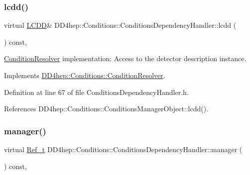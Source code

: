 \subsubsection{\texorpdfstring{lcdd()}{lcdd()}}
{\footnotesize\ttfamily virtual \hyperlink{class_d_d4hep_1_1_geometry_1_1_l_c_d_d}{L\+C\+DD}\& D\+D4hep\+::\+Conditions\+::\+Conditions\+Dependency\+Handler\+::lcdd (\begin{DoxyParamCaption}{ }\end{DoxyParamCaption}) const\hspace{0.3cm}{\ttfamily [inline]}, {\ttfamily [virtual]}}



\hyperlink{class_d_d4hep_1_1_conditions_1_1_condition_resolver}{Condition\+Resolver} implementation\+: Access to the detector description instance. 



Implements \hyperlink{class_d_d4hep_1_1_conditions_1_1_condition_resolver_a9413afdddefecd04036fd7f7b8356fca}{D\+D4hep\+::\+Conditions\+::\+Condition\+Resolver}.



Definition at line 67 of file Conditions\+Dependency\+Handler.\+h.



References D\+D4hep\+::\+Conditions\+::\+Conditions\+Manager\+Object\+::lcdd().

\hypertarget{class_d_d4hep_1_1_conditions_1_1_conditions_dependency_handler_ac0fbf5eeea65550355bf386416f7a3b6}{}\label{class_d_d4hep_1_1_conditions_1_1_conditions_dependency_handler_ac0fbf5eeea65550355bf386416f7a3b6} 
\subsubsection{\texorpdfstring{manager()}{manager()}}
{\footnotesize\ttfamily virtual \hyperlink{group___d_d4_h_e_p___g_e_o_m_e_t_r_y_ga40af83be6718bb8828a3d83dc7f8c930}{Ref\+\_\+t} D\+D4hep\+::\+Conditions\+::\+Conditions\+Dependency\+Handler\+::manager (\begin{DoxyParamCaption}{ }\end{DoxyParamCaption}) const\hspace{0.3cm}{\ttfamily [inline]}, {\ttfamily [virtual]}}



